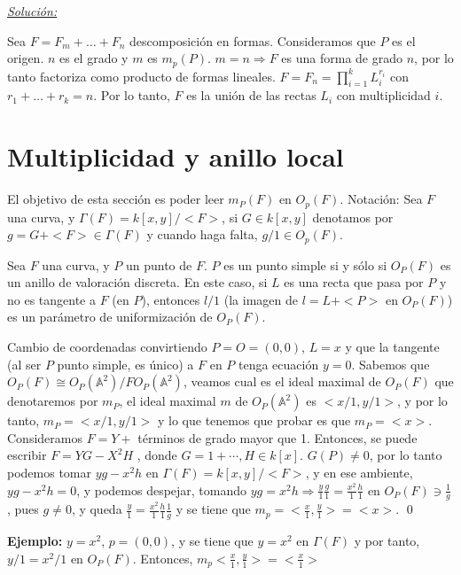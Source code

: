 \underline{\textit{Solución:}}

Sea $F=F_m+\dots + F_n$ descomposición en formas. Consideramos que $P$ es el origen. $n$ es el grado y $m$ es $m_p(P)$. $m=n \Rightarrow F$ es una forma de grado $n$, por lo tanto factoriza como producto de formas lineales. $F=F_n = \prod_{i=1}^k L_i^{r_i}$ con $r_1+\dots + r_k=n$. Por lo tanto, $F$ es la unión de las rectas $L_i$ con multiplicidad $i$. 

\section{Multiplicidad y anillo local}

El objetivo de esta sección es poder leer $m_P(F)$ en $O_p(F)$.
Notación: Sea $F$ una curva, y $\Gamma(F) = k[x,y]/<F>$, si $G\in k[x,y]$ denotamos por $g=G+<F> \in \Gamma(F)$ y cuando haga falta, $g/1\in O_p(F)$. 

\begin{Teo}
Sea $F$ una curva, y $P$ un punto de $F$. $P$ es un punto simple si y sólo si $O_P(F)$ es un anillo de valoración discreta. En este caso, si $L$ es una recta que pasa por $P$ y no es tangente a $F$ (en $P$), entonces $l/1$ (la imagen de $l=L+<P>$ en $O_P(F)$) es un parámetro de uniformización de $O_P(F)$. 
\end{Teo}

\begin{Dem}
\framebox{$\Rightarrow $} Cambio de coordenadas convirtiendo $P=O=(0,0)$, $L=x$ y que la tangente (al ser $P$ punto simple, es único) a $F$ en $P$ tenga ecuación $y=0$. Sabemos que $O_P(F)\cong O_P(\mathbb{A}^2)/ FO_P(\mathbb{A}^2)$, veamos cual es el ideal maximal de $O_P(F)$ que denotaremos por $m_P$, el ideal maximal $m$ de $O_P(\mathbb{A}^2)$ es $<x/1,y/1>$, y por lo tanto, $m_P=<x/1,y/1>$ y lo que tenemos que probar es que $m_P=<x>$. Consideramos $F=Y+$ términos de grado mayor que 1. Entonces, se puede escribir $F=YG-X^2H$ , donde $G=1+\cdots, H\in k[x]$. $G(P)\neq 0$, por lo tanto podemos tomar $yg-x^2h$ en $\Gamma(F)=k[x,y]/<F>$, y en ese ambiente, $yg-x^2h=0$, y podemos despejar, tomando $yg=x^2h \Rightarrow \frac{y}{1}\frac{g}{1}=\frac{x^2}{1}\frac{h}{1}$ en $O_P(F)\ni \frac{1}{g}$, pues $g\neq 0$, y queda $\frac{y}{1}=\frac{x^2}{1}\frac{h}{1}\frac{1}{g}$ y se tiene que $m_p=<\frac{x}{1},\frac{y}{1}>=<x>$.  \qed
\end{Dem}

\textbf{Ejemplo: } $y=x^2$, $p=(0,0)$, y se tiene que $y=x^2$ en $\Gamma(F)$ y por tanto, $y/1=x^2/1$ en $O_P(F)$. Entonces, $m_p<\frac{x}{1},\frac{y}{1}>=<\frac{x}{1}>$


